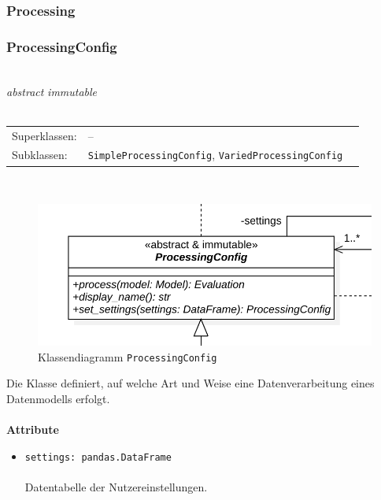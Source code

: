 \documentclass{article}
\begin{document}
\newpage
\subsubsection{Processing}

\subsubsection*{\large{\textbf{ProcessingConfig}\label{cls:ProcessingConfig}}}\\
\textit{\flqq{}abstract\frqq} \textit{\flqq{}immutable\frqq}\normalsize\\\\
\begin{tabular}{lll}
 Superklassen: & --\\
 Subklassen: & \texttt{SimpleProcessingConfig}, \texttt{VariedProcessingConfig}
\end{tabular}\\
\begin{figure}[H]%
    \centering
    \includegraphics[width=13cm]{entwurf/Entwurf_dokument/img/cls/model/ProcessingConfig.png}
    \caption{Klassendiagramm \texttt{ProcessingConfig}}
\end{figure}

Die Klasse definiert, auf welche Art und Weise eine Datenverarbeitung eines Datenmodells erfolgt.
\\\\

\textbf{Attribute}
\begin{itemize}\setlength\itemsep{3em}
\item \texttt{settings: pandas.DataFrame}\\\\
Datentabelle der Nutzereinstellungen.
\\\\
\end{itemize}
\end{document}
